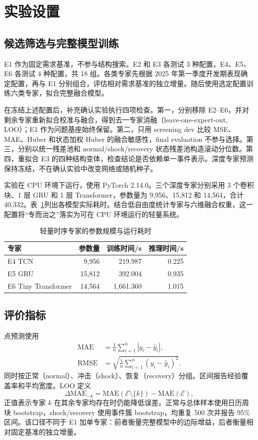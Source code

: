 \documentclass[UTF8,11pt,a4paper]{ctexart}
\begin{document}
\section{实验设置}

\subsection{候选筛选与完整模型训练}

E1 作为固定需求基准，不参与结构搜索。E2 和 E3 各测试 3 种配置，E4、E5、E6 各测试 4 种配置，共 18 组。各类专家先根据 2025 年第一季度开发期表现确定配置，再与 E1 分别组合，评估相对需求基准的独立增量。随后使用选定配置训练六类专家，拟合完整融合模型。

在冻结上述配置后，补充确认实验执行四项检查。第一，分别移除 E2--E6，并对剩余专家重新拟合校准与融合，得到去一专家消融（leave-one-expert-out, LOO）；E1 作为问题基座始终保留。第二，只用 screening dev 比较 MSE、MAE、Huber 和状态加权 Huber 的融合敏感性，final evaluation 不参与选择。第三，分别以统一残差池和 normal/shock/recovery 状态残差池构造滚动分位数。第四，重拟合 E3 的四种结构变体，检查结论是否依赖单一事件表示。深度专家预测保持冻结，不在确认实验中改变网络或随机种子。

实验在 CPU 环境下运行，使用 PyTorch 2.14.0。三个深度专家分别采用 3 个卷积块、1 层 GRU 和 1 层 Transformer，参数量为 9,956、15,812 和 14,564，合计 40,332。表~\ref{tab:engineering}列出各模型实际耗时。结合低自由度统计专家与六维融合权重，这一配置将“专而治之”落实为可在 CPU 环境运行的轻量系统。

\begin{table}[H]
\centering
\caption{轻量时序专家的参数规模与运行耗时}
\label{tab:engineering}
\begin{tabular}{lrrr}
\toprule
专家 & 参数量 & 训练时间/s & 推理时间/s\\
\midrule
E4 TCN & 9,956 & 219.987 & 0.225\\
E5 GRU & 15,812 & 392.004 & 0.935\\
E6 Tiny Transformer & 14,564 & 1,661.360 & 1.015\\
\bottomrule
\end{tabular}
\end{table}


\subsection{评价指标}

点预测使用
\begin{align}
  \mathrm{MAE}&=\frac{1}{n}\sum_{i=1}^{n}|y_i-\widehat y_i|,\\
  \mathrm{RMSE}&=\sqrt{\frac{1}{n}\sum_{i=1}^{n}(y_i-\widehat y_i)^2}.
\end{align}
同时按正常（normal）、冲击（shock）、恢复（recovery）分组。区间报告经验覆盖率和平均宽度。LOO 定义
\begin{equation}
  \Delta\mathrm{MAE}_{-k}=\mathrm{MAE}(\mathcal E\setminus\{k\})-\mathrm{MAE}(\mathcal E),
\end{equation}
正值表示专家 $k$ 在其余专家均存在时仍能降低误差。正常与总体样本使用日历周块 bootstrap，shock/recovery 使用事件簇 bootstrap，均重复 500 次并报告 95\% 区间。该口径不同于 E1 加单专家：前者衡量完整模型中的边际增益，后者衡量相对固定基准的独立增量。
\end{document}
